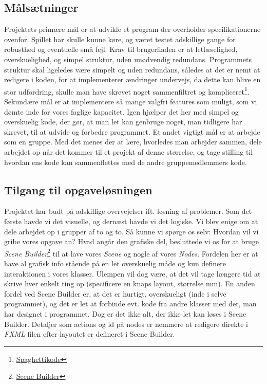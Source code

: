 \subsection{Målsætninger}\label{MS}
Projektets primære mål er at udvikle et program der overholder specifikationerne ovenfor. Spillet har skulle kunne køre, og været testet adskillige gange for robusthed og eventuelle små fejl.\newline
Krav til brugerfladen er at letlæselighed, overskuelighed, og simpel struktur, uden unødvendig redundans. \newline
Programmets struktur skal ligeledes være simpelt og uden redundans, således at det er nemt at redigere i koden, for at implementerer ændringer undervejs, da dette kan blive en stor udfordring, skulle man have skrevet noget sammenfiltret og kompliceret\footnote{\href{https://www.wikiwand.com/en/Spaghetti_code}{Spaghettikode}}.\newline
Sekundære mål er at implementere så mange valgfri features som muligt, som vi dømte inde for vores faglige kapacitet. Igen hjælper det her med simpel og overskuelig kode, der gør, at man let kan genbruge noget, man tidligere har skrevet, til at udvide og forbedre programmet.\newline
Et andet vigtigt mål er at arbejde som en gruppe. Med det menes der at lære, hvorledes man arbejder sammen, dele arbejdet op når det kommer til et projekt af denne størrelse, og tage stilling til hvordan ens kode kan sammenflettes med de andre gruppemedlemmers kode.
\subsection{Tilgang til opgaveløsningen}\label{TTO}
Projektet har budt på adskillige overvejelser ift. løsning af problemer. Som det første havde vi det visuelle, og dernæst havde vi det logiske. Vi blev enige om at dele arbejdet op i grupper af to og to. Så kunne vi spørge os selv: Hvordan vil vi gribe vores opgave an? Hvad angår den grafiske del, besluttede vi os for at bruge \emph{Scene Builder}\footnote{\href{https://gluonhq.com/products/scene-builder/}{Scene Builder}} til at lave vores \emph{Scene} og nogle af vores \emph{Nodes}. Fordelen her er at have al grafisk info stående på en let overskuelig måde og kun definere interaktionen i vores klasser. Ulempen vil dog være, at det vil tage længere tid at skrive hver enkelt ting op (specificere en knaps layout, størrelse mm). En anden fordel ved Scene Builder er, at det er hurtigt, overskueligt (inde i selve programmet), og det er let at forbinde evt. kode fra andre klasser med det, man har designet i programmet.\newline
Dog er det ikke alt, der ikke let kan løses i Scene Builder. Detaljer som actions og id på nodes er nemmere at redigere direkte i \emph{FXML} filen efter layoutet er defineret i Scene Builder.\newline


